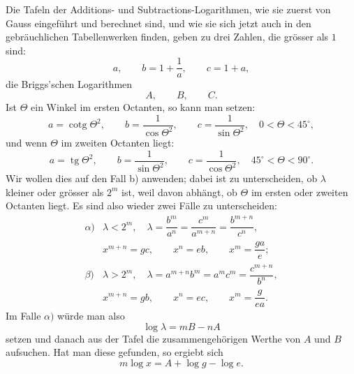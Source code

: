 \documentclass[11pt]{article}
\providecommand{\tg}{\operatorname{tg}}
\providecommand{\cotg}{\operatorname{cotg}}
\begin{document}
Die Tafeln der Additions- und Subtractions-Logarithmen, wie sie zuerst von Gauss eingeführt und berechnet sind, und wie sie sich jetzt auch in den gebräuchlichen Tabellenwerken finden, geben zu drei Zahlen, die grösser als $1$ sind:
\[
        a,\qquad b=1+\frac1a,\qquad c=1+a,
\]
die Briggs'schen Logarithmen
\[
        A,\qquad B,\qquad C.
\]
Ist $\Theta$ ein Winkel im ersten Octanten, so kann man setzen:
\begin{equation}
        a=\cotg\Theta^2,\qquad
        b=\frac1{\cos\Theta^2},\qquad
        c=\frac1{\sin\Theta^2},\quad 0<\Theta<45^\circ,
\tag{3}
\end{equation}
und wenn $\Theta$ im zweiten Octanten liegt:
\begin{equation}
        a=\tg\Theta^2,\qquad
        b=\frac1{\sin\Theta^2},\qquad
        c=\frac1{\cos\Theta^2},\quad 45^\circ<\Theta<90^\circ.
\tag{4}
\end{equation}
Wir wollen dies auf den Fall b) anwenden; dabei ist zu unterscheiden, ob $\lambda$ kleiner oder grösser als $2^m$ ist, weil davon abhängt, ob $\Theta$ im ersten oder zweiten Octanten liegt. Es sind also wieder zwei Fälle zu unterscheiden:
\[
\begin{array}{ll}
\alpha)& \lambda<2^m,\quad
\lambda=\dfrac{b^m}{a^n}=\dfrac{c^m}{a^{m+n}}=\dfrac{b^{m+n}}{c^n},\\[1.0em]
& x^{m+n}=gc,\qquad x^n=eb,\qquad x^m=\dfrac{ga}{e};\\[1.2em]
\beta)& \lambda>2^m,\quad
\lambda=a^{m+n}b^m=a^mc^m=\dfrac{c^{m+n}}{b^n},\\[1.0em]
& x^{m+n}=gb,\qquad x^n=ec,\qquad x^m=\dfrac{g}{ea}.
\end{array}
\tag{5}
\]
Im Falle $\alpha)$ würde man also
\begin{equation}
        \log\lambda=mB-nA
\tag{6}
\end{equation}
setzen und danach aus der Tafel die zusammengehörigen Werthe von $A$ und $B$ aufsuchen. Hat man diese gefunden, so ergiebt sich
\begin{equation}
        m\log x=A+\log g-\log e.
\tag{7}
\end{equation}
\end{document}
